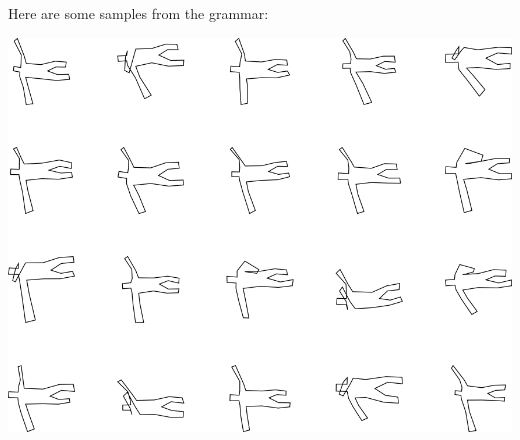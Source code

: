 Here are some samples from the grammar:

\includegraphics[width=6in]{output/3.learning/incremental/gram.10.d/samples.png}

